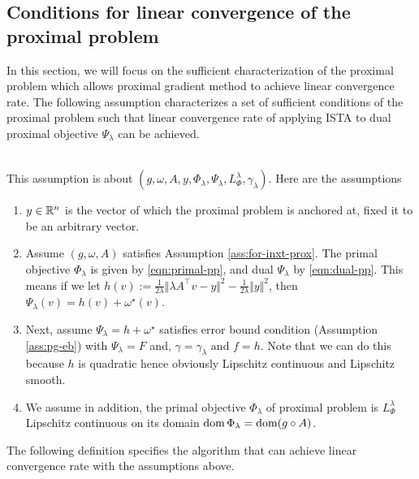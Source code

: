 \documentclass[12pt]{article}
\begin{document}
    \subsection{Conditions for linear convergence of the proximal problem}\label{sec:conds-lin-cnvg-pp}
        In this section, we will focus on the sufficient characterization of the proximal problem which allows proximal gradient method to achieve linear convergence rate. 
        The following assumption characterizes a set of sufficient conditions of the proximal problem such that linear convergence rate of applying ISTA to dual proximal objective $\Psi_\lambda$ can be achieved. 
        \begin{assumption}\;\label{ass:lin-cnvg-for-pp}\\
            This assumption is about $(g, \omega, A, y, \Phi_\lambda, \Psi_\lambda, L^\lambda_{\Phi} ,\gamma_\lambda)$. 
            Here are the assumptions
            \begin{enumerate}[nosep]
                \item $y \in \mathbb R^n$ is the vector of which the proximal problem is anchored at, fixed it to be an arbitrary vector. 
                \item Assume $(g, \omega, A)$ satisfies Assumption \ref{ass:for-inxt-prox}. The primal objective $\Phi_\lambda$ is given by \eqref{eqn:primal-pp}, and dual $\Psi_\lambda$ by \eqref{eqn:dual-pp}. This means if we let $h(v) := \frac{1}{2\lambda}\Vert \lambda A^\top v - y\Vert^2 - \frac{1}{2\lambda}\Vert y\Vert^2$, then $\Psi_\lambda(v) = h(v) + \omega^\star(v)$. 
                \item Next, assume $\Psi_\lambda = h + \omega^\star$ satisfies error bound condition (Assumption \ref{ass:pg-eb}) with $\Psi_\lambda = F$ and, $\gamma = \gamma_\lambda$ and $f = h$. Note that we can do this because $h$ is quadratic hence obviously Lipschitz continuous and Lipschitz smooth. 
                \item We assume in addition, the primal objective $\Phi_\lambda$ of proximal problem is $L_\Phi^\lambda$ Lipschitz continuous on its domain $\operatorname{dom} \Phi_\lambda = \operatorname{dom} (g\circ A)$. 
            \end{enumerate}
        \end{assumption}
        The following definition specifies the algorithm that can achieve linear convergence rate with the assumptions above. 
\end{document}
